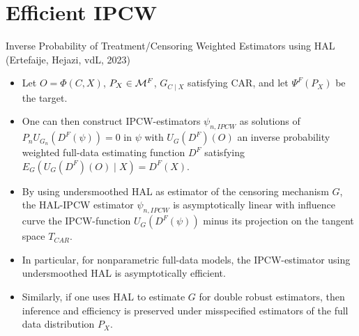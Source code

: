 \documentclass[t]{beamer}
\newlength{\wideitemsep}
\let\olditem\item
\renewcommand{\item}{\setlength{\itemsep}{\wideitemsep}\olditem}
\begin{document}
\section{Efficient IPCW}

\begin{frame}{Inverse Probability of Treatment/Censoring Weighted Estimators using HAL (Ertefaije, Hejazi, vdL, 2023)}
\begin{itemize}
\item Let $O=\Phi(C,X)$, $P_X\in {\cal M}^F$, $G_{C\mid X}$ satisfying CAR, and let $\Psi^F(P_X) $ be the target.
\item One can then construct IPCW-estimators $\psi_{n,IPCW}$ as solutions of $P_n U_{G_n}(D^F(\psi))=0$ in $\psi$ with $U_G(D^F)(O)$ an inverse probability weighted full-data estimating function $D^F$ satisfying $E_G(U_G(D^F)(O)\mid X)=D^F(X)$.
\item By using undersmoothed HAL as estimator of the censoring mechanism $G$, the HAL-IPCW estimator $\psi_{n,IPCW}$  is asymptotically linear with influence curve the IPCW-function $U_G(D^F(\psi))$ minus its projection on the tangent space $T_{CAR}$.
\end{itemize}
\end{frame}
\begin{frame}
\begin{itemize}
\item In particular, for nonparametric full-data models, the IPCW-estimator using undersmoothed HAL is asymptotically efficient.
\item Similarly, if one uses HAL to estimate $G$ for double robust estimators, then inference and efficiency is preserved under misspecified estimators of the full data distribution $P_X$.
\end{itemize}
\end{frame}
\end{document}
